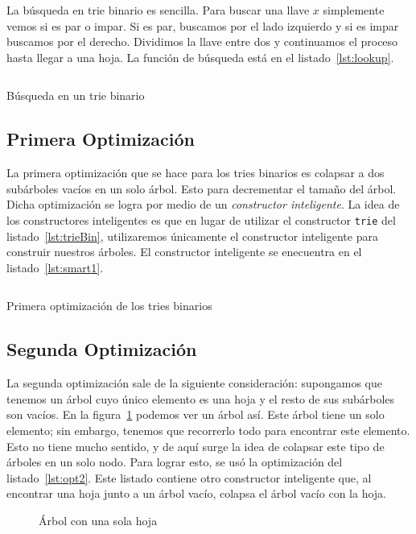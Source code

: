 \documentclass[11pt,letterpaper]{article}
\begin{document}
La búsqueda en trie binario es sencilla. Para buscar una llave $x$ simplemente vemos si es par o impar. Si es par, buscamos por el lado izquierdo y si es impar buscamos por el derecho. Dividimos la llave entre dos y continuamos el proceso hasta llegar a una hoja. La función de búsqueda está en el listado~\ref{lst:lookup}.

\begin{listing}[H]
  \inputminted{coq}{src/lookup.v}
  \caption{Búsqueda en un trie binario}
  \label{lst:lookup}
\end{listing}


\subsection{Primera Optimización}
\noindent La primera optimización que se hace para los tries binarios es colapsar a dos subárboles vacíos en un solo árbol. Esto para decrementar el tamaño del árbol. Dicha optimización se logra por medio de un \textit{constructor inteligente}. La idea de los constructores inteligentes es que en lugar de utilizar el constructor \texttt{trie} del listado~\ref{lst:trieBin}, utilizaremos únicamente el constructor inteligente para construir nuestros árboles. El constructor inteligente se enecuentra en el listado~\ref{lst:smart1}.

\begin{listing}[H]
  \inputminted{coq}{src/smart1.v}
  \caption{Primera optimización de los tries binarios}
  \label{lst:smart1}
\end{listing}

\subsection{Segunda Optimización}
\noindent La segunda optimización sale de la siguiente consideración: supongamos que tenemos un árbol cuyo único elemento es una hoja y el resto de sus subárboles son vacíos. En la figura~\ref{fig:arbol_chafa} podemos ver un árbol así. Este árbol tiene un solo elemento; sin embargo, tenemos que recorrerlo todo para encontrar este elemento. Esto no tiene mucho sentido, y de aquí surge la idea de colapsar este tipo de árboles en un solo nodo. Para lograr esto, se usó la optimización del listado~\ref{lst:opt2}. Este listado contiene otro constructor inteligente que, al encontrar una hoja junto a un árbol vacío, colapsa el árbol vacío con la hoja.

\begin{figure}[h]
  \caption{Árbol con una sola hoja}
  \label{fig:arbol_chafa}
   \centering
\end{figure}
\end{document}
